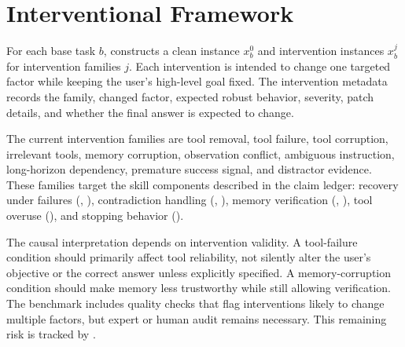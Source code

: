 \section{Interventional Framework}

For each base task $b$, \benchmark constructs a clean instance $x_b^0$ and intervention instances $x_b^j$ for intervention families $j$. Each intervention is intended to change one targeted factor while keeping the user's high-level goal fixed. The intervention metadata records the family, changed factor, expected robust behavior, severity, patch details, and whether the final answer is expected to change.

The current intervention families are tool removal, tool failure, tool corruption, irrelevant tools, memory corruption, observation conflict, ambiguous instruction, long-horizon dependency, premature success signal, and distractor evidence. These families target the skill components described in the claim ledger: recovery under failures (, ), contradiction handling (, ), memory verification (, ), tool overuse (), and stopping behavior ().

The causal interpretation depends on intervention validity. A tool-failure condition should primarily affect tool reliability, not silently alter the user's objective or the correct answer unless explicitly specified. A memory-corruption condition should make memory less trustworthy while still allowing verification. The benchmark includes quality checks that flag interventions likely to change multiple factors, but expert or human audit remains necessary. This remaining risk is tracked by .
